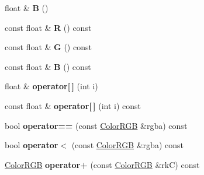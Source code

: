 \begin{DoxyCompactItemize}
\item 
float \& {\bfseries B} ()\hypertarget{class_i_dream_sky_1_1_color_r_g_b_a18840bde32ee236a53eca8afa8bff12c}{}\label{class_i_dream_sky_1_1_color_r_g_b_a18840bde32ee236a53eca8afa8bff12c}

\item 
const float \& {\bfseries R} () const \hypertarget{class_i_dream_sky_1_1_color_r_g_b_a892ccf1d39763c1012fe030bbfa40261}{}\label{class_i_dream_sky_1_1_color_r_g_b_a892ccf1d39763c1012fe030bbfa40261}

\item 
const float \& {\bfseries G} () const \hypertarget{class_i_dream_sky_1_1_color_r_g_b_a2533d049d99ac8c4a45bc745ad13d4da}{}\label{class_i_dream_sky_1_1_color_r_g_b_a2533d049d99ac8c4a45bc745ad13d4da}

\item 
const float \& {\bfseries B} () const \hypertarget{class_i_dream_sky_1_1_color_r_g_b_a42ebdd26bb5cbf0f6aa4668a0d793def}{}\label{class_i_dream_sky_1_1_color_r_g_b_a42ebdd26bb5cbf0f6aa4668a0d793def}

\item 
float \& {\bfseries operator\mbox{[}$\,$\mbox{]}} (int i)\hypertarget{class_i_dream_sky_1_1_color_r_g_b_a504e11b256be12e3796e0542af43d6c1}{}\label{class_i_dream_sky_1_1_color_r_g_b_a504e11b256be12e3796e0542af43d6c1}

\item 
const float \& {\bfseries operator\mbox{[}$\,$\mbox{]}} (int i) const \hypertarget{class_i_dream_sky_1_1_color_r_g_b_a099fcbf0ede623a5ec17600893b3792d}{}\label{class_i_dream_sky_1_1_color_r_g_b_a099fcbf0ede623a5ec17600893b3792d}

\item 
bool {\bfseries operator==} (const \hyperlink{class_i_dream_sky_1_1_color_r_g_b}{Color\+R\+GB} \&rgba) const \hypertarget{class_i_dream_sky_1_1_color_r_g_b_a96fe3b83d593664b8260ea17ee8b07af}{}\label{class_i_dream_sky_1_1_color_r_g_b_a96fe3b83d593664b8260ea17ee8b07af}

\item 
bool {\bfseries operator$<$} (const \hyperlink{class_i_dream_sky_1_1_color_r_g_b}{Color\+R\+GB} \&rgba) const \hypertarget{class_i_dream_sky_1_1_color_r_g_b_aeb2ccac52122c8efdf5e75abbe26c389}{}\label{class_i_dream_sky_1_1_color_r_g_b_aeb2ccac52122c8efdf5e75abbe26c389}

\item 
\hyperlink{class_i_dream_sky_1_1_color_r_g_b}{Color\+R\+GB} {\bfseries operator+} (const \hyperlink{class_i_dream_sky_1_1_color_r_g_b}{Color\+R\+GB} \&rkC) const \hypertarget{class_i_dream_sky_1_1_color_r_g_b_a743299844754fc35a8b00842f4d8ccb6}{}\label{class_i_dream_sky_1_1_color_r_g_b_a743299844754fc35a8b00842f4d8ccb6}


\end{DoxyCompactItemize}
